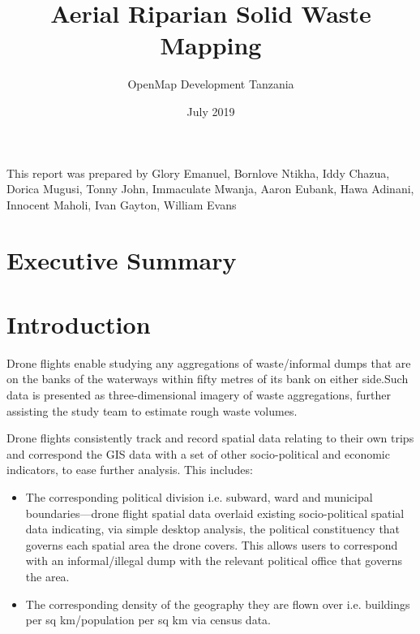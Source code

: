 \documentclass[a4paper,12pt,twoside]{article}
\title{Aerial Riparian Solid Waste Mapping}
\author{OpenMap Development Tanzania}
\date{July 2019}
\begin{document}
\maketitle

This report was prepared by Glory Emanuel, Bornlove Ntikha, Iddy Chazua, Dorica Mugusi, Tonny John, Immaculate Mwanja, Aaron Eubank, Hawa Adinani, Innocent Maholi, Ivan Gayton, William Evans


\newpage
\tableofcontents

\newpage
\section{Executive Summary}
\begin{multicols}{3}

\lipsum[0-3]

\end{multicols}

\section{Introduction}

\lipsum[0-4]
  
Drone flights enable studying any aggregations of waste/informal dumps that are on the banks of the waterways within fifty metres of its bank on either side.Such data is presented as three-dimensional imagery of waste aggregations, further assisting the study team to estimate rough waste volumes.

Drone flights consistently track and record spatial data relating to their own trips and correspond the GIS data with a set of other socio-political and economic indicators, to ease further analysis. This includes:   

\begin{itemize}
    \item The corresponding political division i.e. subward, ward and municipal boundaries—drone flight spatial data overlaid existing socio-political spatial data indicating, via simple desktop analysis, the political constituency that governs each spatial area the drone covers. This allows users to correspond with an informal/illegal dump with the relevant political office that governs the area.
    \item The corresponding density of the geography they are flown over i.e. buildings per sq km/population per sq km via census data. 
\end{itemize}
\end{document}
